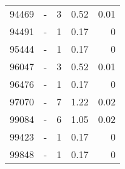 \begin{longtable}{lXrrr}
        94469 & \multicolumn{1}{X}{-} & %
          \num{3} &
          \num[round-mode=places,round-precision=2]{0.52} &
          \num[round-mode=places,round-precision=2]{0.01} \\

        94491 & \multicolumn{1}{X}{-} & %
          \num{1} &
          \num[round-mode=places,round-precision=2]{0.17} &
          \num[round-mode=places,round-precision=2]{0} \\

        95444 & \multicolumn{1}{X}{-} & %
          \num{1} &
          \num[round-mode=places,round-precision=2]{0.17} &
          \num[round-mode=places,round-precision=2]{0} \\

        96047 & \multicolumn{1}{X}{-} & %
          \num{3} &
          \num[round-mode=places,round-precision=2]{0.52} &
          \num[round-mode=places,round-precision=2]{0.01} \\

        96476 & \multicolumn{1}{X}{-} & %
          \num{1} &
          \num[round-mode=places,round-precision=2]{0.17} &
          \num[round-mode=places,round-precision=2]{0} \\

        97070 & \multicolumn{1}{X}{-} & %
          \num{7} &
          \num[round-mode=places,round-precision=2]{1.22} &
          \num[round-mode=places,round-precision=2]{0.02} \\

        99084 & \multicolumn{1}{X}{-} & %
          \num{6} &
          \num[round-mode=places,round-precision=2]{1.05} &
          \num[round-mode=places,round-precision=2]{0.02} \\

        99423 & \multicolumn{1}{X}{-} & %
          \num{1} &
          \num[round-mode=places,round-precision=2]{0.17} &
          \num[round-mode=places,round-precision=2]{0} \\

        99848 & \multicolumn{1}{X}{-} & %
          \num{1} &
          \num[round-mode=places,round-precision=2]{0.17} &
          \num[round-mode=places,round-precision=2]{0} \\


\end{longtable}
